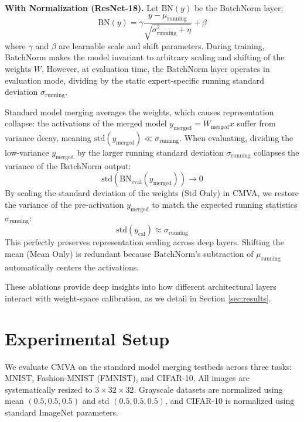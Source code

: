 \documentclass{article}
\theoremstyle{plain}
\theoremstyle{definition}
\theoremstyle{remark}
\begin{document}
\textbf{With Normalization (ResNet-18).} Let $\text{BN}(y)$ be the BatchNorm layer:
\begin{equation}
  \text{BN}(y) = \gamma \frac{y - \mu_{\text{running}}}{\sqrt{\sigma^2_{\text{running}} + \eta}} + \beta
\end{equation}
where $\gamma$ and $\beta$ are learnable scale and shift parameters. During training, BatchNorm makes the model invariant to arbitrary scaling and shifting of the weights $W$. However, at evaluation time, the BatchNorm layer operates in evaluation mode, dividing by the static expert-specific running standard deviation $\sigma_{\text{running}}$.

Standard model merging averages the weights, which causes representation collapse: the activations of the merged model $y_{\text{merged}} = W_{\text{merged}} x$ suffer from variance decay, meaning $\text{std}(y_{\text{merged}}) \ll \sigma_{\text{running}}$. When evaluating, dividing the low-variance $y_{\text{merged}}$ by the larger running standard deviation $\sigma_{\text{running}}$ collapses the variance of the BatchNorm output:
\begin{equation}
  \text{std}(\text{BN}_{\text{eval}}(y_{\text{merged}})) \to 0
\end{equation}
By scaling the standard deviation of the weights (Std Only) in CMVA, we restore the variance of the pre-activation $y_{\text{merged}}$ to match the expected running statistics $\sigma_{\text{running}}$:
\begin{equation}
  \text{std}(y_{\text{cal}}) \approx \sigma_{\text{running}}
\end{equation}
This perfectly preserves representation scaling across deep layers. Shifting the mean (Mean Only) is redundant because BatchNorm's subtraction of $\mu_{\text{running}}$ automatically centers the activations.

These ablations provide deep insights into how different architectural layers interact with weight-space calibration, as we detail in Section \ref{sec:results}.

\section{Experimental Setup}
\label{sec:setup}

We evaluate CMVA on the standard model merging testbeds across three tasks: MNIST, Fashion-MNIST (FMNIST), and CIFAR-10. All images are systematically resized to $3 \times 32 \times 32$. Grayscale datasets are normalized using mean $(0.5, 0.5, 0.5)$ and std $(0.5, 0.5, 0.5)$, and CIFAR-10 is normalized using standard ImageNet parameters.
\end{document}
